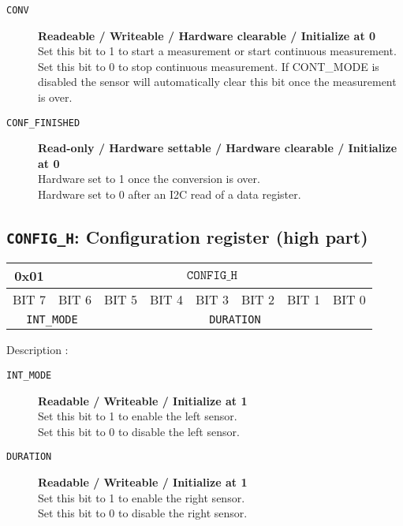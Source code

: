 \begin{description}
	\item[\texttt{CONV}] \qquad \textbf{Readeable / Writeable / Hardware clearable / Initialize at 0}\\
	Set this bit to 1 to start a measurement or start continuous measurement.\\
	Set this bit to 0 to stop continuous measurement. If CONT\_MODE is disabled the sensor will automatically clear this bit once the measurement is over.
	
	\item[\texttt{CONF\_FINISHED}] \qquad \textbf{Read-only / Hardware settable / Hardware clearable / Initialize at 0}\\
	Hardware set to 1 once the conversion is over. \\
	Hardware set to 0 after an I2C read of a data register.
\end{description}

\subsection{\texttt{CONFIG\_H}: Configuration register (high part)}
\begin{tabular}{|c|c|c|c|c|c|c|c|}
\hline
0x01 & \multicolumn{7}{|c|}{$\texttt{CONFIG\_H}$}\\
\hline
BIT 7 & BIT 6 & BIT 5 & BIT 4 & BIT 3 & BIT 2 & BIT 1 & BIT 0 \\ 
\hline
\multicolumn{2}{|c|}{\texttt{INT\_MODE}} & \multicolumn{6}{c|}{\texttt{DURATION}}\\
\hline
\end{tabular} 

Description :
\begin{description}
	\item[\texttt{INT\_MODE}] \qquad \textbf{Readable / Writeable / Initialize at 1}\\
	Set this bit to 1 to enable the left sensor.\\
	Set this bit to 0 to disable the left sensor.
	
	\item[\texttt{DURATION}] \qquad \textbf{Readable / Writeable / Initialize at 1}\\
	Set this bit to 1 to enable the right sensor.\\
	Set this bit to 0 to disable the right sensor.
\end{description}
